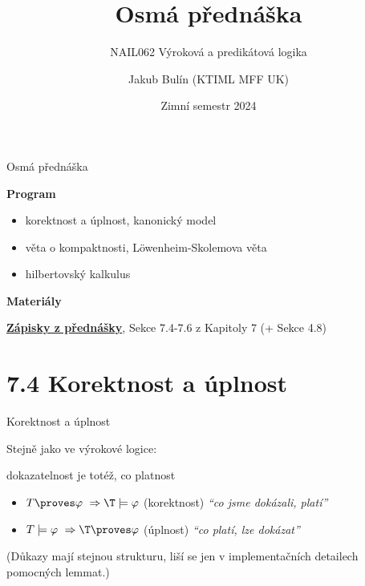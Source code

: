 \documentclass{beamer}
\title{Osmá přednáška}
\subtitle{NAIL062 Výroková a predikátová logika}
\author{Jakub Bulín (KTIML MFF UK)}
\date{Zimní semestr 2024}
\begin{document}
\maketitle


\begin{frame}{Osmá přednáška}

    \textbf{Program}
        \begin{itemize}
            \item korektnost a úplnost, kanonický model
            \item věta o kompaktnosti, Löwenheim-Skolemova věta
            \item hilbertovský kalkulus
        \end{itemize}

    \textbf{Materiály}

        \href{https://github.com/jbulin-mff-uk/nail062/raw/main/lecture/lecture-notes/lecture-notes.pdf}{\alert{\textbf{Zápisky z přednášky}}}, Sekce 7.4-7.6 z Kapitoly 7 (+ Sekce 4.8)

\end{frame}


\section{7.4 Korektnost a úplnost}


\begin{frame}{Korektnost a úplnost}
    
    \pause
    Stejně jako ve výrokové logice:
    
    \pause
    \begin{center}
        \alert{dokazatelnost} je totéž, co \alert{platnost}    
    \end{center}    

    \pause
    \begin{itemize}
        \item \alert{$T\proves\varphi\ \Rightarrow\T\models\varphi$} \hspace{0.5cm} (korektnost) \hfill {\it``co jsme dokázali, platí''}
        \item\alert{$T\models\varphi\ \Rightarrow\T\proves\varphi$}  \hspace{0.5cm} (úplnost) \hfill {\it ``co platí, lze dokázat''}
    \end{itemize} 

    \bigskip

    \pause
    (Důkazy mají stejnou strukturu, liší se jen v implementačních detailech pomocných lemmat.)
 
\end{frame}
\end{document}
